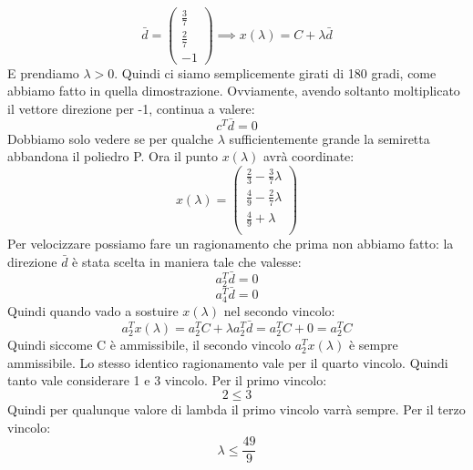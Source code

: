 \begin{equation*}
    \bar{d} = \begin{pmatrix}
        \frac{3}{7}\\
        \frac{2}{7}\\
        -1
    \end{pmatrix} \implies x(\lambda) = C + \lambda \bar{d}
\end{equation*}
E prendiamo $\lambda > 0$. Quindi ci siamo semplicemente girati di 180 gradi, come abbiamo fatto in quella dimostrazione. Ovviamente, avendo soltanto moltiplicato il vettore direzione per -1, continua a valere:
\begin{equation*}
    c^T\bar{d} = 0
\end{equation*}
Dobbiamo solo vedere se per qualche $\lambda$ sufficientemente grande la semiretta abbandona il poliedro P. Ora il punto $x(\lambda)$ avrà coordinate:
\begin{equation*}
    x(\lambda) = \begin{pmatrix}
        \frac{2}{3}-\frac{3}{7}\lambda\\
        \frac{4}{9}-\frac{2}{7}\lambda\\
        \frac{4}{9}+\lambda\\
    \end{pmatrix}
\end{equation*}
Per velocizzare possiamo fare un ragionamento che prima non abbiamo fatto: la direzione $\bar{d}$ è stata scelta in maniera tale che valesse:
\begin{equation*}
    a_2^T\bar{d} = 0
\end{equation*}
\begin{equation*}
    a_4^T\bar{d} = 0
\end{equation*}
Quindi quando vado a sostuire $x(\lambda)$ nel secondo vincolo:
\begin{equation*}
    a_2^Tx(\lambda) = a_2^TC + \lambda a_2^T\bar{d} = a_2^TC + 0 = a_2^TC 
\end{equation*}
Quindi siccome C è ammissibile, il secondo vincolo $a_2^Tx(\lambda)$ è sempre ammissibile. Lo stesso identico ragionamento vale per il quarto vincolo. Quindi tanto vale considerare 1 e 3 vincolo. Per il primo vincolo: 
\begin{equation*}
    2 \leq 3
\end{equation*}
Quindi per qualunque valore di lambda il primo vincolo varrà sempre. Per il terzo vincolo:
\begin{equation*}
    \lambda \leq \frac{49}{9}
\end{equation*}
